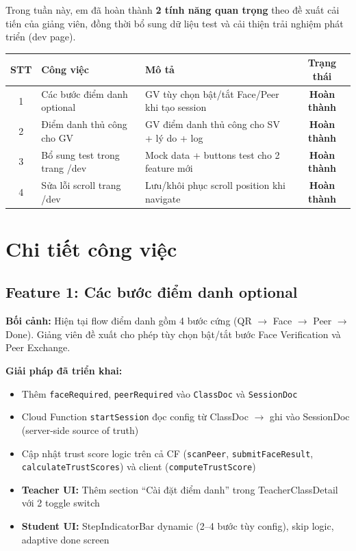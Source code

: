 \documentclass{article}
\begin{document}
Trong tuần này, em đã hoàn thành \textbf{2 tính năng quan trọng} theo đề xuất cải tiến của giảng viên, đồng thời bổ sung dữ liệu test và cải thiện trải nghiệm phát triển (dev page).

\begin{center}
\begin{tabularx}{\textwidth}{@{}c l X c@{}}
\toprule
\textbf{STT} & \textbf{Công việc} & \textbf{Mô tả} & \textbf{Trạng thái} \\
\midrule
1 & Các bước điểm danh optional & GV tùy chọn bật/tắt Face/Peer khi tạo session & \textcolor{statusgreen}{\textbf{Hoàn thành}} \\
2 & Điểm danh thủ công cho GV & GV điểm danh thủ công cho SV + lý do + log & \textcolor{statusgreen}{\textbf{Hoàn thành}} \\
3 & Bổ sung test trong trang /dev & Mock data + buttons test cho 2 feature mới & \textcolor{statusgreen}{\textbf{Hoàn thành}} \\
4 & Sửa lỗi scroll trang /dev & Lưu/khôi phục scroll position khi navigate & \textcolor{statusgreen}{\textbf{Hoàn thành}} \\
\bottomrule
\end{tabularx}
\end{center}

\section{Chi tiết công việc}

\subsection{Feature 1: Các bước điểm danh optional}

\textbf{Bối cảnh:} Hiện tại flow điểm danh gồm 4 bước cứng (QR $\rightarrow$ Face $\rightarrow$ Peer $\rightarrow$ Done). Giảng viên đề xuất cho phép tùy chọn bật/tắt bước Face Verification và Peer Exchange.

\textbf{Giải pháp đã triển khai:}
\begin{itemize}[leftmargin=1.5em]
  \item Thêm \texttt{faceRequired}, \texttt{peerRequired} vào \texttt{ClassDoc} và \texttt{SessionDoc}
  \item Cloud Function \texttt{startSession} đọc config từ ClassDoc $\rightarrow$ ghi vào SessionDoc (server-side source of truth)
  \item Cập nhật trust score logic trên cả CF (\texttt{scanPeer}, \texttt{submitFaceResult}, \texttt{calculateTrustScores}) và client (\texttt{computeTrustScore})
  \item \textbf{Teacher UI:} Thêm section ``Cài đặt điểm danh'' trong TeacherClassDetail với 2 toggle switch
  \item \textbf{Student UI:} StepIndicatorBar dynamic (2--4 bước tùy config), skip logic, adaptive done screen
\end{itemize}
\end{document}
